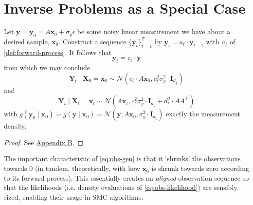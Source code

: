\section{Inverse Problems as a Special Case} \label{sec:inv-prob-spec-case}

\begin{proposition} \label{prop:obs-gen}
    Let $\mathbf{y} = \mathbf{y}_0 = A\mathbf{x}_0 + \sigma_y\epsilon$ be some noisy linear
    measurement we have about a desired sample, $\mathbf{x}_0$. Construct a sequence
    $\{\mathbf{y}_t\}_{t=1}^T$ by $\mathbf{y}_t = a_t\cdot \mathbf{y}_{t-1}$ with $a_t$ of
    \autoref{def:forward-process}. It follows that
    \begin{equation}
        \mathbf{y}_t = c_t\cdot \mathbf{y} \label{eq:obs-gen}
    \end{equation}
    from which we may conclude
    \begin{equation*}
        \mathbf{Y}_t \mid \mathbf{X}_0 = \mathbf{x}_0 \sim \mathcal{N}(c_t\cdot A\mathbf{x}_0, c_t^2\sigma_y^2\cdot \mathbf{I}_{d_y})
    \end{equation*}
    and
    \begin{equation}
        \mathbf{Y}_t \mid \mathbf{X}_t = \mathbf{x}_t \sim \mathcal{N}(A\mathbf{x}_t, c_t^2\sigma_y^2\cdot \mathbf{I}_{d_y} + d_t^2\cdot AA^\top) \label{eq:obs-likelihood}
    \end{equation}
    with $g(\mathbf{y}_0 \mid \mathbf{x}_0) = g(\mathbf{y} \mid \mathbf{x}_0) = \mathcal{N}(\mathbf{y}; A\mathbf{x}_0, \sigma_y^2\cdot \mathbf{I}_{d_y})$
    exactly the measurement density.
\end{proposition}

\begin{proof}
    See \hyperref[prf:obs-generation]{Appendix B}.
\end{proof}

\begin{remark}[Shrinking] \label{rem:shrinking}
    The important characteristic of \autoref{eq:obs-gen} is that it `shrinks' the
    observations towards 0 (in tandem, theoretically, with how $\mathbf{x}_0$
    is shrunk towards zero according to its forward process). This essentially creates an
    \emph{aligned} observation sequence so that the likelihoods (i.e. density evaluations of
    \autoref{eq:obs-likelihood}) are sensibly sized, enabling their usage in SMC algorithms.
\end{remark}

